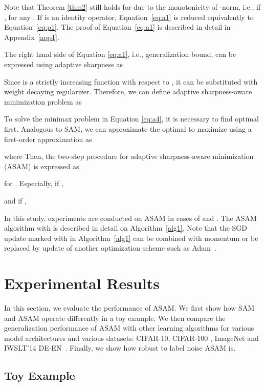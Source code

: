 \documentclass{article}
\begin{document}
Note that Theorem \ref{thm2} still holds for  due to the monotonicity of -norm, i.e.,
if ,  for any .
If  is an identity operator, Equation~\ref{eq:a1} is reduced equivalently to Equation~\ref{eq:p1}.
The proof of Equation~\ref{eq:a1} is described in detail in Appendix~\ref{app1}. 

The right hand side of Equation \ref{eq:a1}, i.e., generalization bound, can be expressed using adaptive sharpness as
\ificml
    
\else
    
\fi

Since  is a strictly increasing function with respect to , it can be substituted with  weight decaying regularizer. Therefore, we can define adaptive sharpness-aware minimization problem as

To solve the minimax problem in Equation \ref{eq:a4}, it is necessary to find optimal  first.
Analogous to SAM, we can approximate the optimal  to maximize  using a first-order approximation as

\noindent where 
Then, the two-step procedure for adaptive sharpness-aware minimization (ASAM) is expressed as

for .
Especially, if ,

and if ,


In this study, experiments are conducted on ASAM in cases of  and . 
The ASAM algorithm with  is described in detail on Algorithm~\ref{alg1}. Note that the SGD \citep{nesterov1983method} update marked with  in Algorithm~\ref{alg1} can be combined with momentum or be replaced by update of another optimization scheme such as Adam~\citep{kingma2015adam}.




\section{Experimental Results} \label{sec:e}
In this section, we evaluate the performance of ASAM.
We first show how SAM and ASAM operate differently in a toy example.
We then compare the generalization performance of ASAM with other learning algorithms for various model architectures and various datasets: CIFAR-10, CIFAR-100 \citep{krizhevsky2009cifar}, ImageNet \citep{imagenet} and IWSLT'14 DE-EN~\citep{cettolo2014report}. Finally, we show how robust to label noise ASAM is.

\subsection{Toy Example} \label{toy}
\end{document}
